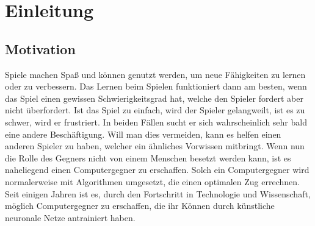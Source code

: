 \chapter{Einleitung}
\label{cha:Einleitung}



\section{Motivation}

Spiele machen Spaß und können genutzt werden, um neue Fähigkeiten zu lernen oder zu verbessern. Das Lernen beim Spielen funktioniert dann am besten, wenn das Spiel einen gewissen Schwierigkeitsgrad hat, welche den Spieler fordert aber nicht überfordert. Ist das Spiel zu einfach, wird der Spieler gelangweilt, ist es zu schwer, wird er frustriert. In beiden Fällen sucht er sich wahrscheinlich sehr bald eine andere Beschäftigung. Will man dies vermeiden, kann es helfen einen anderen Spieler zu haben, welcher ein ähnliches Vorwissen mitbringt. Wenn nun die Rolle des Gegners nicht von einem Menschen besetzt werden kann, ist es naheliegend einen Computergegner zu erschaffen. Solch ein Computergegner wird normalerweise mit Algorithmen umgesetzt, die einen optimalen Zug errechnen. Seit einigen Jahren ist es, durch den Fortschritt in Technologie und Wissenschaft, möglich Computergegner zu erschaffen, die ihr Können durch künstliche neuronale Netze antrainiert haben. 


\newpage

